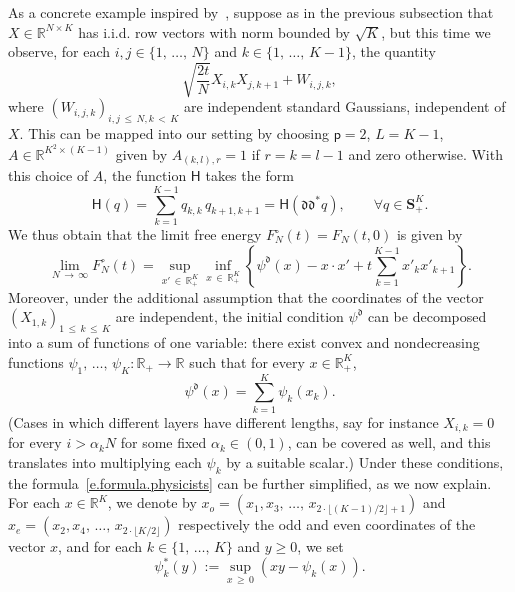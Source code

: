 \documentclass[AHL,Unicode,longabstracts,published]{cedram}
\newcommand{\R}{\mathbb{R}}
\renewcommand{\S}{\mathbf{S}}
\renewcommand{\H}{\mathsf{H}}
\newcommand{\sfp}{\mathsf{p}}
\newcommand{\diag}{\mathfrak{d}}
\renewcommand{\le}{\leqslant}
\renewcommand{\ge}{\geqslant}
\newcommand{\Ll}{\left}
\newcommand{\Rr}{\right}
\newcommand{\al}{\alpha}
\let\oldforall\forall
\renewcommand*{\forall}{\mathrel{\oldforall}}
\begin{document}
As a concrete example inspired by~\cite{accm}, suppose as in the previous subsection that $X \in \R^{N\times K}$ has i.i.d. row vectors with norm bounded by $\sqrt{K}$, but this time we observe, for each $i,j \in \{1,\,\ldots,\,N\}$ and $k \in \{1,\,\ldots,\,K-1\}$, the quantity
\begin{equation*}
\sqrt{\frac{2t}{N}} X_{i,k} X_{j,k+1} + W_{i,j,k},
\end{equation*}
where $(W_{i,j,k})_{i,j\,\le\,N, k\,<\,K}$ are independent standard Gaussians, independent of $X$. This can be mapped into our setting by choosing $\sfp=2$, $L = K-1$, $A \in \R^{K^2 \times (K-1)}$ given by $A_{(k,l),r} = 1$ if $r = k = l-1$ and zero otherwise. With this choice of $A$, the function $\H$ takes the form
\begin{equation*}
\H(q) = \sum_{k = 1}^{K-1} q_{k,k} \, q_{k+1,k+1} = \H(\diag\diag^* q), \qquad \forall q \in \S^K_+.
\end{equation*}
We thus obtain that the limit free energy $F_N^\circ(t) = F_N(t,0)$ is given by
\begin{equation}\label{e.formula.physicists}
\lim_{N\,\to\,\infty} F_N^\circ(t) = \sup_{x'\,\in\,\R^K_+}\inf_{x\,\in\,\R^K_+}\Ll\{\psi^\diag\!\left(x\right)- x \cdot x' +t \sum_{k = 1}^{K-1} x'_k x'_{k+1}\Rr\}.
\end{equation}
Moreover, under the additional assumption that the coordinates of the vector $(X_{1,k})_{1\,\le\,k\,\le\,K}$ are independent, the initial condition $\psi^\diag$ can be decomposed into a sum of functions of one variable: there exist convex and nondecreasing functions $\psi_1,\,\ldots,\,\psi_K : \R_+ \to \R$ such that for every $x \in \R_+^K$,
\begin{equation*}
\psi^\diag\!(x) = \sum_{k = 1}^K \psi_k(x_k).
\end{equation*}
(Cases in which different layers have different lengths, say for instance $X_{i,k} = 0$ for every $i > \al_k N$ for some fixed $\al_k \in (0,1)$, can be covered as well, and this translates into multiplying each $\psi_k$ by a suitable scalar.) Under these conditions, the formula~\eqref{e.formula.physicists} can be further simplified, as we now explain. For each $x \in \R^K$, we denote by $x_o = (x_1,x_3,\,\ldots,\,x_{2\cdot\lfloor (K-1)/2 \rfloor + 1})$ and $x_e = (x_2, x_4,\,\ldots,\,x_{2 \cdot \lfloor K/2 \rfloor})$ respectively the odd and even coordinates of the vector $x$, and for each $k \in \{1,\,\ldots,\,K\}$ and $y \ge 0$, we set
\begin{equation*}
\psi_k^*(y) := \sup_{x\,\ge\,0} \Ll(xy - \psi_k(x)\Rr).
\end{equation*}
\end{document}
